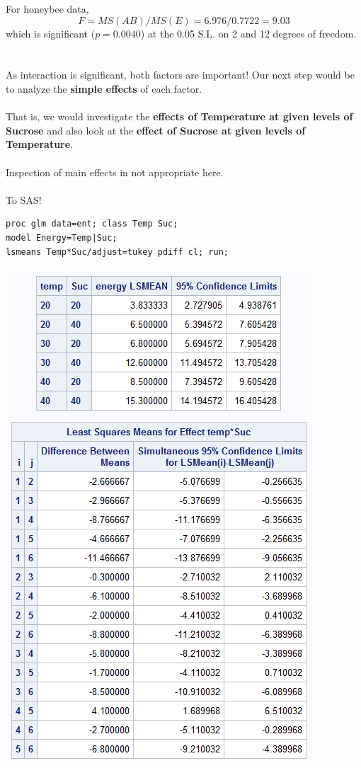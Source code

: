 For honeybee data, 
$$ F=MS(AB)/MS(E) = 6.976/0.7722= 9.03$$
which is significant ($p=0.0040$) at the 0.05 S.L. on 2 and 12 degrees of freedom.\\~\\~\\


As interaction is significant, both factors are important!  Our next step would be to analyze the \textbf{simple effects} of each factor.  \\~\\

That is, we would investigate the \textbf{effects of Temperature at given levels of Sucrose} and also look at the \textbf{effect of Sucrose at given levels of Temperature}.\\~\\

Inspection of main effects in not appropriate here.\\~\\

To SAS!

\newpage

\begin{small}
\begin{verbatim}
proc glm data=ent; class Temp Suc;
model Energy=Temp|Suc;
lsmeans Temp*Suc/adjust=tukey pdiff cl; run;
\end{verbatim}
\end{small}

\begin{flushleft}
\includegraphics[scale=0.7]{EntDiffs2}
\end{flushleft}

